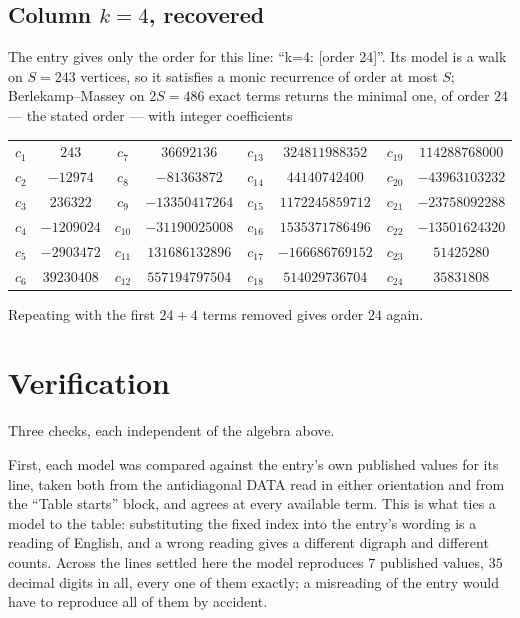 \documentclass[11pt,a4paper]{article}
\theoremstyle{plain}
\theoremstyle{definition}
\begin{document}
\subsection*{Column $k=4$, recovered}
The entry gives only the order for this line: ``k=4: [order 24]''. Its model is a walk on
$S=243$ vertices, so it satisfies a monic recurrence of order at most $S$;
Berlekamp--Massey on $2S=486$ exact terms returns the minimal one, of order
$24$ --- the stated order --- with integer coefficients
\begin{center}\small\begin{tabular}{cccccccc}
$c_{1}$ & $243$ & $c_{7}$ & $36692136$ & $c_{13}$ & $324811988352$ & $c_{19}$ & $114288768000$ \\
$c_{2}$ & $-12974$ & $c_{8}$ & $-81363872$ & $c_{14}$ & $44140742400$ & $c_{20}$ & $-43963103232$ \\
$c_{3}$ & $236322$ & $c_{9}$ & $-13350417264$ & $c_{15}$ & $1172245859712$ & $c_{21}$ & $-23758092288$ \\
$c_{4}$ & $-1209024$ & $c_{10}$ & $-31190025008$ & $c_{16}$ & $1535371786496$ & $c_{22}$ & $-13501624320$ \\
$c_{5}$ & $-2903472$ & $c_{11}$ & $131686132896$ & $c_{17}$ & $-166686769152$ & $c_{23}$ & $51425280$ \\
$c_{6}$ & $39230408$ & $c_{12}$ & $557194797504$ & $c_{18}$ & $514029736704$ & $c_{24}$ & $35831808$ \\
\end{tabular}\end{center}
Repeating with the first $24+4$ terms removed gives order $24$ again.

\section{Verification}

Three checks, each independent of the algebra above.

First, each model was compared against the entry's own published values for its line, taken
both from the antidiagonal DATA read in either orientation and from the ``Table starts''
block, and agrees at every available term. This is what ties a model to the table:
substituting the fixed index into the entry's wording is a reading of English, and a wrong
reading gives a different digraph and different counts. Across the lines settled here the
model reproduces $7$ published values, $35$ decimal digits in all, every one of
them exactly; a misreading of the entry would have to reproduce all of them by accident.
\end{document}
